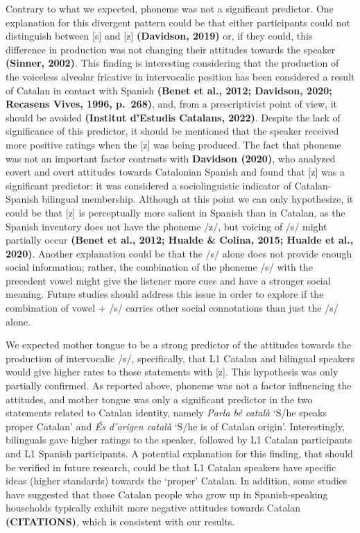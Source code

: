 \documentclass[
  a4paper,
  11pt,
  twocolumn]{article}
\begin{document}
Contrary to what we expected, phoneme was not a significant predictor.
One explanation for this divergent pattern could be that either
participants could not distinguish between {[}s{]} and {[}z{]}
\textbf{(Davidson, 2019)} or, if they could, this difference in
production was not changing their attitudes towards the speaker
\textbf{(Sinner, 2002)}. This finding is interesting considering that
the production of the voiceless alveolar fricative in intervocalic
position has been considered a result of Catalan in contact with Spanish
\textbf{(Benet et al., 2012; Davidson, 2020; Recasens Vives, 1996,
p.~268)}, and, from a prescriptivist point of view, it should be avoided
\textbf{(Institut d'Estudis Catalans, 2022)}. Despite the lack of
significance of this predictor, it should be mentioned that the speaker
received more positive ratings when the {[}z{]} was being produced. The
fact that phoneme was not an important factor contrasts with
\textbf{Davidson (2020)}, who analyzed covert and overt attitudes
towards Catalonian Spanish and found that {[}z{]} was a significant
predictor: it was considered a sociolinguistic indicator of
Catalan-Spanish bilingual membership. Although at this point we can only
hypothesize, it could be that {[}z{]} is perceptually more salient in
Spanish than in Catalan, as the Spanish inventory does not have the
phoneme /z/, but voicing of /s/ might partially occur \textbf{(Benet et
al., 2012; Hualde \& Colina, 2015; Hualde et al., 2020)}. Another
explanation could be that the /s/ alone does not provide enough social
information; rather, the combination of the phoneme /s/ with the
precedent vowel might give the listener more cues and have a stronger
social meaning. Future studies should address this issue in order to
explore if the combination of vowel + /s/ carries other social
connotations than just the /s/ alone.

We expected mother tongue to be a strong predictor of the attitudes
towards the production of intervocalic /s/, specifically, that L1
Catalan and bilingual speakers would give higher rates to those
statements with {[}z{]}. This hypothesis was only partially confirmed.
As reported above, phoneme was not a factor influencing the attitudes,
and mother tongue was only a significant predictor in the two statements
related to Catalan identity, namely \emph{Parla bé català} `S/he speaks
proper Catalan' and \emph{És d'origen català} `S/he is of Catalan
origin'. Interestingly, bilinguals gave higher ratings to the speaker,
followed by L1 Catalan participants and L1 Spanish participants. A
potential explanation for this finding, that should be verified in
future research, could be that L1 Catalan speakers have specific ideas
(higher standards) towards the `proper' Catalan. In addition, some
studies have suggested that those Catalan people who grow up in
Spanish-speaking households typically exhibit more negative attitudes
towards Catalan \textbf{(CITATIONS)}, which is consistent with our
results.
\end{document}
